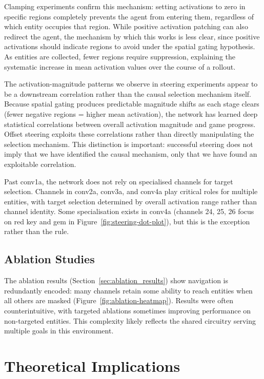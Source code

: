 Clamping experiments confirm this mechanism: setting activations to zero in specific regions completely prevents the agent from entering them, regardless of which entity occupies that region. While positive activation patching can also redirect the agent, the mechanism by which this works is less clear, since positive activations should indicate regions to avoid under the spatial gating hypothesis. As entities are collected, fewer regions require suppression, explaining the systematic increase in mean activation values over the course of a rollout.

The activation-magnitude patterns we observe in steering experiments appear to be a downstream correlation rather than the causal selection mechanism itself. Because spatial gating produces predictable magnitude shifts as each stage clears (fewer negative regions = higher mean activation), the network has learned deep statistical correlations between overall activation magnitude and game progress. Offset steering exploits these correlations rather than directly manipulating the selection mechanism. This distinction is important: successful steering does not imply that we have identified the causal mechanism, only that we have found an exploitable correlation.

Past conv1a, the network does not rely on specialised channels for target selection. Channels in conv2a, conv3a, and conv4a play critical roles for multiple entities, with target selection determined by overall activation range rather than channel identity. Some specialisation exists in conv4a (channels 24, 25, 26 focus on red key and gem in Figure~\ref{fig:steering-dot-plot}), but this is the exception rather than the rule.

\subsection{Ablation Studies}

The ablation results (Section~\ref{sec:ablation_results}) show navigation is redundantly encoded: many channels retain some ability to reach entities when all others are masked (Figure~\ref{fig:ablation-heatmap}). Results were often counterintuitive, with targeted ablations sometimes improving performance on non-targeted entities. This complexity likely reflects the shared circuitry serving multiple goals in this environment.

\section{Theoretical Implications}
\label{sec:theoretical}

